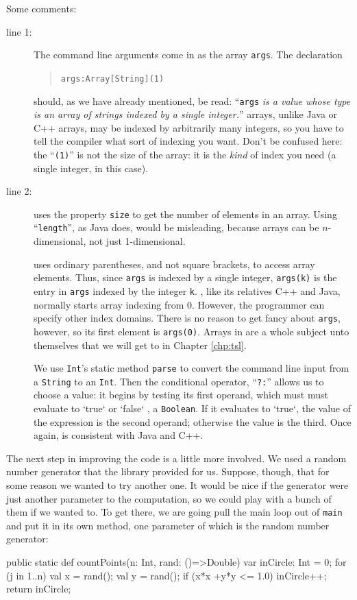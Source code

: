 Some comments:
\begin{description}
\item[line 1:]
The command line arguments come in as the array {\tt args}.  The declaration
\begin{quote} {\tt args:Array[String](1)}  \end{quote}
should, as we have already mentioned, be read: ``{\tt args} {\em is a value whose type
is an array of strings indexed by a single integer.}''   \Xten{} arrays, unlike Java
or C++ arrays, may be indexed by arbitrarily many integers, so you have to 
tell the compiler what sort of indexing you want.  Don't be confused here: the
``{\tt (1)}'' is not the size of the array: it is the {\em kind} of index you
need (a single integer, in this case).
\item[line 2:]
 \Xten{} uses the property {\tt size} to get the number of elements in
an array.  Using ``{\tt length}'', as Java does,
would be misleading, because \Xten{} arrays can be $n$-dimensional, not just
1-dimensional.

\Xten{} uses ordinary parentheses, and not square brackets, to access array elements.  
Thus, since {\tt args} is indexed by a single integer, {\tt args(k)} is the
entry in {\tt args} indexed by the integer {\tt k}.  \Xten, like its relatives
C++ and Java, normally starts array indexing from 0.  However, the \Xten{} programmer can
specify other index domains. There is no reason to get fancy about {\tt args}, however,
so its first element is {\tt args(0)}. Arrays in \Xten{} are a whole subject unto
themselves that we will get to in Chapter \ref{chp:tsl}.

We use {\tt Int}'s static method {\tt parse} to convert the command line input
from a {\tt String} to an {\tt Int}.  Then the conditional operator, 
``{\tt ?:}'' allows us to choose a value:
it begins by testing its first operand, which must must evaluate to \xcd`true`
or 
\xcd`false`
, \ie{} a {\tt Boolean}. If it evaluates to \xcd`true`, the value of the
expression is the second operand; otherwise the value is the third.
Once again, \Xten{} is consistent with Java and C++.
\end{description} 
The next step in improving the code is a little more involved.
We used a random number generator
that the \Xten{} library provided for us.  Suppose, though,
that for some reason we wanted to try another one. 
It would be nice if the generator
were just another parameter to the computation, so we could play with a bunch
of them if we wanted to.  To get there, we are going pull the main loop
out of {\tt main} and put it in its own method, one parameter of which is the
random number generator:
\begin{xtennum}[]
public static def countPoints(n: Int, rand: ()=>Double) {
   var inCircle: Int = 0;
   for (j in 1..n) {
      val x = rand();
      val y = rand();
      if (x*x +y*y <= 1.0) inCircle++;
   }
   return inCircle;
}
\end{xtennum}
 


